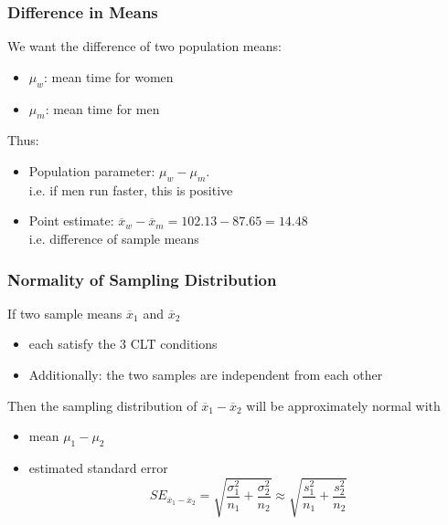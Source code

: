 \documentclass[handout]{beamer}
\newcommand{\blue}[1]{\textcolor{blue2}{#1}}
\newcommand{\xbar}{\overline{x}}
\begin{document}


\begin{frame}[fragile]
\frametitle{Difference in Means}
%
%
We want the difference of two population means:
\pause\begin{itemize}
\item $\mu_w$: mean time for women
\item $\mu_m$: mean time for men
\end{itemize}

Thus:
\begin{itemize}
\pause\item Population parameter:  $\mu_w - \mu_m$.\\
i.e. if men run faster, this is positive
\pause\item Point estimate:  $\xbar_w - \xbar_m = 102.13-87.65=14.48$\\
i.e. \blue{difference of sample means}
\end{itemize}
\end{frame}


\begin{frame}[fragile]
\frametitle{Normality of Sampling Distribution}
%
%
If two sample means $\xbar_1$ and $\xbar_2$ 
\begin{itemize}
\pause\item each satisfy the 3 CLT conditions
\pause\item Additionally: the \blue{two samples are independent from each other}
\end{itemize}

\vspace{0.25cm}

\pause Then the sampling distribution of $\xbar_1 - \xbar_2$ will be approximately normal with
\begin{itemize}
\pause\item mean $\mu_1-\mu_2$
\pause\item estimated standard error
\[
SE_{\xbar_1 - \xbar_2} = \sqrt{\frac{\sigma_1^2}{n_1} + \frac{\sigma_2^2}{n_2}} \approx \sqrt{\frac{s_1^2}{n_1} + \frac{s_2^2}{n_2}}
\]
\end{itemize}
\end{frame}
\end{document}
